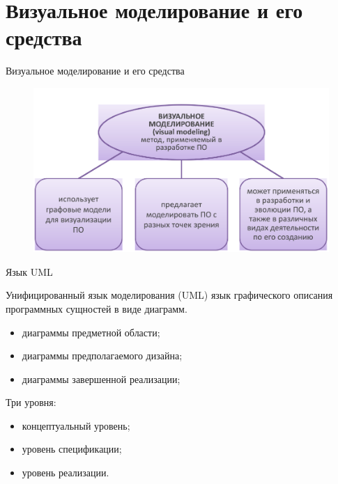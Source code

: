 \documentclass{beamer}
\begin{document}
\section{Визуальное моделирование и его средства}

\begin{frame}[t]{Визуальное моделирование и его средства}
\begin{figure}[h]
\centering
\includegraphics[scale=0.45]{images/lec03-pic01.png}
\end{figure}
\end{frame} 

\begin{frame}[t]{Язык UML}
\begin{block}{Унифицированный язык моделирования (UML)}
язык графического описания программных сущностей в виде диаграмм.
\end{block}
\begin{itemize}
\item диаграммы предметной области;
\item диаграммы предполагаемого дизайна;
\item диаграммы завершенной реализации;
\end{itemize}
Три уровня:
\begin{itemize}
\item концептуальный уровень;
\item уровень спецификации;
\item уровень реализации.
\end{itemize}
\end{frame}
\end{document}
